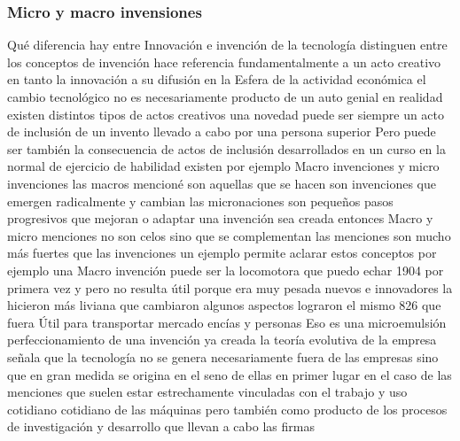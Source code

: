 \documentclass[12pt]{book}
\begin{document}
\subsubsection{Micro y macro invensiones}
Qué diferencia hay entre Innovación e invención de la tecnología distinguen entre los conceptos de invención hace referencia fundamentalmente a un acto creativo en tanto la innovación a su difusión en la Esfera de la actividad económica el cambio tecnológico no es necesariamente producto de un auto genial en realidad existen distintos tipos de actos creativos una novedad puede ser siempre un acto de inclusión de un invento llevado a cabo por una persona superior Pero puede ser también la consecuencia de actos de inclusión desarrollados en un curso en la normal de ejercicio de habilidad existen por ejemplo Macro invenciones y micro invenciones las macros mencioné son aquellas que se hacen son invenciones que emergen radicalmente y cambian las micronaciones son pequeños pasos progresivos que mejoran o adaptar una invención sea creada entonces Macro y micro menciones no son celos sino que se complementan las menciones son mucho más fuertes que las invenciones un ejemplo permite aclarar estos conceptos por ejemplo una Macro invención puede ser la locomotora que puedo echar 1904 por primera vez y pero no resulta útil porque era muy pesada nuevos e innovadores la hicieron más liviana que cambiaron algunos aspectos lograron el mismo 826 que fuera Útil para transportar mercado encías y personas Eso es una microemulsión perfeccionamiento de una invención ya creada la teoría evolutiva de la empresa señala que la tecnología no se genera necesariamente fuera de las empresas sino que en gran medida se origina en el seno de ellas en primer lugar en el caso de las menciones que suelen estar estrechamente vinculadas con el trabajo y uso cotidiano cotidiano de las máquinas pero también como producto de los procesos de investigación y desarrollo que llevan a cabo las firmas
\end{document}
